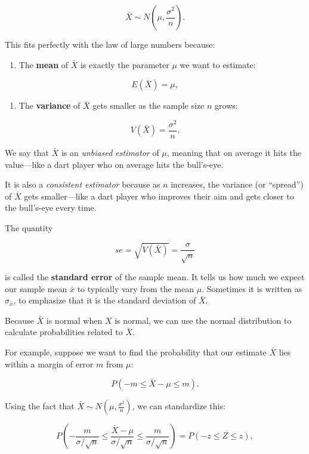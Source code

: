 \documentclass[
]{book}
\providecommand{\tightlist}{%
  \setlength{\itemsep}{0pt}\setlength{\parskip}{0pt}}
\begin{document}
\[
\bar{X} \sim N\left(\mu, \frac{\sigma^2}{n}\right).
\]

This fits perfectly with the law of large numbers because:

\begin{enumerate}
\def\labelenumi{\arabic{enumi}.}
\tightlist
\item
  The \textbf{mean} of \(\bar{X}\) is exactly the parameter \(\mu\) we want to estimate:
\end{enumerate}

\[
E(\bar{X}) = \mu,
\]

\begin{enumerate}
\def\labelenumi{\arabic{enumi}.}
\setcounter{enumi}{1}
\tightlist
\item
  The \textbf{variance} of \(\bar{X}\) gets smaller as the sample size \(n\) grows:
\end{enumerate}

\[
V(\bar{X}) = \frac{\sigma^2}{n}.
\]

We say that \(\bar{X}\) is an \emph{unbiased estimator} of \(\mu\), meaning that on average it hits the value---like a dart player who on average hits the bull's-eye.

It is also a \emph{consistent estimator} because as \(n\) increases, the variance (or ``spread'') of \(\bar{X}\) gets smaller---like a dart player who improves their aim and gets closer to the bull's-eye every time.

The quantity

\[
se = \sqrt{V(\bar{X})} = \frac{\sigma}{\sqrt{n}}
\]

is called the \textbf{standard error} of the sample mean. It tells us how much we expect our sample mean \(\bar{x}\) to typically vary from the mean \(\mu\). Sometimes it is written as \(\sigma_{\bar{x}}\), to emphasize that it is the standard deviation of \(\bar{X}\).

Because \(\bar{X}\) is normal when \(X\) is normal, we can use the normal distribution to calculate probabilities related to \(\bar{X}\).

For example, suppose we want to find the probability that our estimate \(\bar{X}\) lies within a margin of error \(m\) from \(\mu\):

\[
P(-m \leq \bar{X} - \mu \leq m).
\]

Using the fact that \(\bar{X} \sim N\left(\mu, \frac{\sigma^2}{n}\right)\), we can standardize this:

\[
P\left(-\frac{m}{\sigma/\sqrt{n}} \leq \frac{\bar{X} - \mu}{\sigma/\sqrt{n}} \leq \frac{m}{\sigma/\sqrt{n}}\right) = P(-z \leq Z \leq z),
\]
\end{document}
